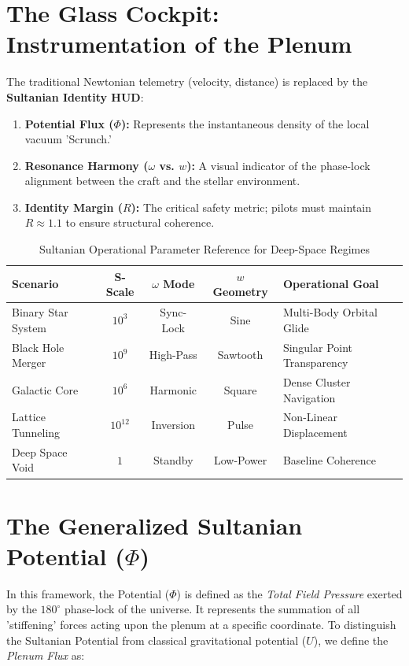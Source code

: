 \documentclass[11pt]{article}
\begin{document}
\section{The Glass Cockpit: Instrumentation of the Plenum}
The traditional Newtonian telemetry (velocity, distance) is replaced by the \textbf{Sultanian Identity HUD}:
\begin{enumerate}
    \item \textbf{Potential Flux ($\Phi$):} Represents the instantaneous density of the local vacuum 'Scrunch.'
    \item \textbf{Resonance Harmony ($\omega$ vs. $w$):} A visual indicator of the phase-lock alignment between the craft and the stellar environment.
    \item \textbf{Identity Margin ($R$):} The critical safety metric; pilots must maintain $R \approx 1.1$ to ensure structural coherence.
\end{enumerate}

\begin{table}[h]
\centering
\caption{Sultanian Operational Parameter Reference for Deep-Space Regimes}
\label{tab:pilot_ref}
\begin{tabularx}{\textwidth}{@{} l c c c X @{}}
\toprule
\textbf{Scenario} & \textbf{S-Scale} & \textbf{$\omega$ Mode} & \textbf{$w$ Geometry} & \textbf{Operational Goal} \\ \midrule
Binary Star System & $10^{3}$ & Sync-Lock & Sine & Multi-Body Orbital Glide \\
Black Hole Merger & $10^{9}$ & High-Pass & Sawtooth & Singular Point Transparency \\
Galactic Core & $10^{6}$ & Harmonic & Square & Dense Cluster Navigation \\
Lattice Tunneling & $10^{12}$ & Inversion & Pulse & Non-Linear Displacement \\
Deep Space Void & $1$ & Standby & Low-Power & Baseline Coherence \\ \bottomrule
\end{tabularx}
\end{table}

\section{The Generalized Sultanian Potential ($\Phi$)}

In this framework, the Potential ($\Phi$) is defined as the \textit{Total Field Pressure} exerted by the $180^\circ$ phase-lock of the universe. It represents the summation of all 'stiffening' forces acting upon the plenum at a specific coordinate. To distinguish the Sultanian Potential from classical gravitational potential ($U$), we define the \textit{Plenum Flux} as:
\end{document}
